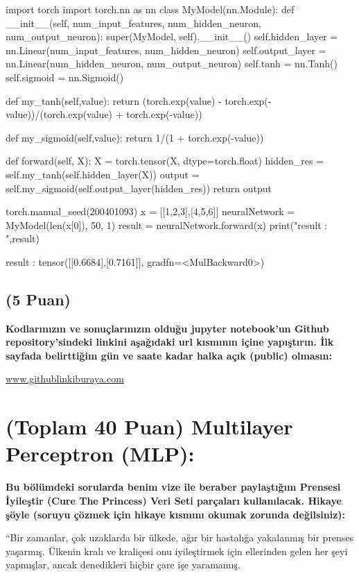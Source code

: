 \documentclass[11pt]{article}
\begin{document}
\begin{python}
import torch
import torch.nn as nn
class MyModel(nn.Module):
    def __init__(self, num_input_features, num_hidden_neuron, num_output_neuron):
        super(MyModel, self).__init__()
        self.hidden_layer = nn.Linear(num_input_features, num_hidden_neuron)
        self.output_layer = nn.Linear(num_hidden_neuron, num_output_neuron)
        self.tanh = nn.Tanh()
        self.sigmoid = nn.Sigmoid()
        
    def my_tanh(self,value):
        return (torch.exp(value) - torch.exp(-value))/(torch.exp(value) + torch.exp(-value))
    
    def my_sigmoid(self,value):
        return 1/(1 + torch.exp(-value))

    def forward(self, X):
        X = torch.tensor(X, dtype=torch.float)
        hidden_res = self.my_tanh(self.hidden_layer(X))
        output = self.my_sigmoid(self.output_layer(hidden_res))
        return output
        
torch.manual_seed(200401093)
x = [[1,2,3],[4,5,6]]
neuralNetwork = MyModel(len(x[0]), 50, 1)
result = neuralNetwork.forward(x)
print("result : ",result)
\end{python}

result :  tensor([[0.6684],[0.7161]], gradfn=<MulBackward0>)

\subsection{(5 Puan)} \textbf{Kodlarınızın ve sonuçlarınızın olduğu jupyter notebook'un Github repository'sindeki linkini aşağıdaki url kısmının içine yapıştırın. İlk sayfada belirttiğim gün ve saate kadar halka açık (public) olmasın:}

\url{www.githublinkiburaya.com}

\section{(Toplam 40 Puan) Multilayer Perceptron (MLP):} 
\textbf{Bu bölümdeki sorularda benim vize ile beraber paylaştığım Prensesi İyileştir (Cure The Princess) Veri Seti parçaları kullanılacak. Hikaye şöyle (soruyu çözmek için hikaye kısmını okumak zorunda değilsiniz):} 

``Bir zamanlar, çok uzaklarda bir ülkede, ağır bir hastalığa yakalanmış bir prenses yaşarmış. Ülkenin kralı ve kraliçesi onu iyileştirmek için ellerinden gelen her şeyi yapmışlar, ancak denedikleri hiçbir çare işe yaramamış.
\end{document}
